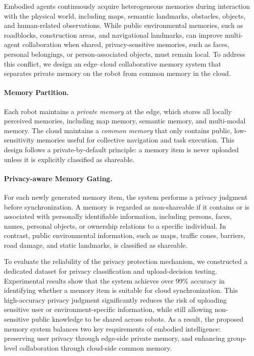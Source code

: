 Embodied agents continuously acquire heterogeneous memories during interaction with the physical world, including maps, semantic landmarks, obstacles, objects, and human-related observations. 
While public environmental memories, such as roadblocks, construction areas, and navigational landmarks, can improve multi-agent collaboration when shared, privacy-sensitive memories, such as faces, personal belongings, or person-associated objects, must remain local. 
To address this conflict, we design an edge--cloud collaborative memory system that separates private memory on the robot from common memory in the cloud.

\paragraph{Memory Partition.}
Each robot maintains a \emph{private memory} at the edge, which stores all locally perceived memories, including map memory, semantic memory, and multi-modal memory. 
The cloud maintains a \emph{common memory} that only contains public, low-sensitivity memories useful for collective navigation and task execution. 
This design follows a private-by-default principle: a memory item is never uploaded unless it is explicitly classified as shareable.

\paragraph{Privacy-aware Memory Gating.}
For each newly generated memory item, the system performs a privacy judgment before synchronization. 
A memory is regarded as non-shareable if it contains or is associated with personally identifiable information, including persons, faces, names, personal objects, or ownership relations to a specific individual. 
In contrast, public environmental information, such as maps, traffic cones, barriers, road damage, and static landmarks, is classified as shareable.


To evaluate the reliability of the privacy protection mechanism, we constructed a dedicated dataset for privacy classification and upload-decision testing. Experimental results show that the system achieves over 99\% accuracy in identifying whether a memory item is suitable for cloud synchronization. This high-accuracy privacy judgment significantly reduces the risk of uploading sensitive user or environment-specific information, while still allowing non-sensitive public knowledge to be shared across robots. As a result, the proposed memory system balances two key requirements of embodied intelligence: preserving user privacy through edge-side private memory, and enhancing group-level collaboration through cloud-side common memory.

